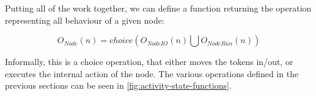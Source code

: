 \begin{definition}
	Putting all of the work together, we can define a function returning the operation representing all behaviour of a given node:
	
	\begin{equation*}
		O_\mathit{Node}(n) = \mathit{choice}\left(O_\mathit{NodeIO}(n) \bigcup O_\mathit{NodeRun}(n)\right)
	\end{equation*}
\end{definition}

Informally, this is a choice operation, that either moves the tokens in/out, or executes the internal action of the node. The various operations defined in the previous sections can be seen in \autoref{fig:activity-state-functions}. 

\iffalse

